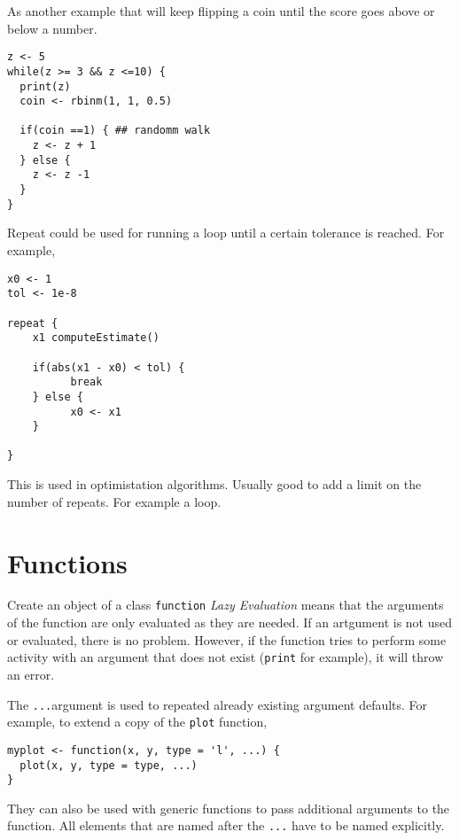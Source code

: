 \documentclass[12pt, a4paper, oneside]{article}\usepackage[]{graphicx}\usepackage[]{color}
\begin{document}
As another example that will keep flipping a coin until the score goes above or below a number. 

\begin{lstlisting}
z <- 5
while(z >= 3 && z <=10) {
  print(z)
  coin <- rbinm(1, 1, 0.5)
  
  if(coin ==1) { ## randomm walk
    z <- z + 1
  } else {
    z <- z -1
  }
}
\end{lstlisting}

Repeat could be used for running a loop until a certain tolerance is reached.  For example, 
\begin{lstlisting}
x0 <- 1
tol <- 1e-8

repeat {
    x1 computeEstimate()
    
    if(abs(x1 - x0) < tol) {
          break
    } else {
          x0 <- x1
    }
      
}
\end{lstlisting}

This is used in optimistation algorithms. Usually good to add a limit on the number of repeats. For example a loop. 

\section{Functions}
Create an object of a class \lstinline{function}
\emph{Lazy Evaluation} means that the arguments of the function are only evaluated as they are needed. If an artgument is not used or evaluated, there is no problem. However, if the function tries to perform some activity with an argument that does not exist (\lstinline{print} for example), it will throw an error. 

The  \lstinline{...}argument is used to repeated already existing argument defaults.  For example, to extend a copy of the \lstinline{plot} function, 

\begin{lstlisting}
myplot <- function(x, y, type = 'l', ...) {
  plot(x, y, type = type, ...)
}
\end{lstlisting}

They can also be used with generic functions to pass additional arguments to the function.  All elements that are named after the \lstinline{...} have to be named explicitly. 
\end{document}
